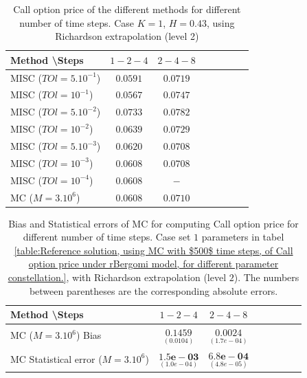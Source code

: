\documentclass[11pt]{article}
\begin{document}
\FloatBarrier

\begin{table}[h!]
	\centering
	\begin{tabular}{l*{6}{c}r}
		Method \textbackslash  Steps           &$1-2-4$ & $2-4-8$ \\
		\hline
		MISC ($TOl=5.10^{-1}$)& $0.0591$  & $0.0719$ \\
		
		MISC ($TOl=10^{-1}$)  &$0.0567$  &$0.0747$   \\
		MISC ($TOl=5.10^{-2}$)  & $0.0733$ & $0.0782$  \\
			MISC ($TOl=10^{-2}$)  & $		0.0639$ & $0.0729$   \\
			MISC ($TOl=5.10^{-3}$)  & $	0.0620$ & $0.0708$   \\
MISC ($TOl=10^{-3}$)  & $	0.0608$ & $0.0708$  \\
MISC ($TOl=10^{-4}$)  & $	0.0608$ & $-$   \\
		\hline
			MC ($M=3.10^6$)  & $0.0608$ & $0.0710$   \\
		\hline 
	\end{tabular}
	\caption{ Call option price of the different methods for different number of time steps. Case $K=1$, $H=0.43$, using Richardson extrapolation (level 2)}
	\label{table: Call option price of the different methods for different number of time steps. Case $K=1$, using Richardson extrapolation_level2}
\end{table}




\begin{table}[h!]
\centering
\begin{tabular}{l*{6}{c}r}
Method \textbackslash  Steps            & $1-2-4$ & $2-4-8$  \\
\hline
MC ($M=3.10^6$)  Bias   &$\underset{( 0.0104)}{\mathbf{ 0.1459}}$  & $\underset{(    1.7e-04)}{\mathbf{0.0024}}$   \\	

MC Statistical error ($M=3.10^6$)   & $\underset{( 1.0e-04)}{\mathbf{1.5e-03}}$  & $\underset{(   4.8e-05)}{\mathbf{    6.8e-04}}$  \\	



\hline
\end{tabular}
\caption{Bias and Statistical errors of MC   for computing Call option price  for different number of time steps. Case set $1$ parameters in tabel \ref{table:Reference solution, using MC with $500$ time steps, of Call option price under rBergomi model, for different parameter constellation.}, with Richardson extrapolation (level $2$). The numbers between parentheses are the corresponding absolute errors.}
\label{Bias and Statistical errors of MC ($M=3.10^6$)  for computing Call option price  for different number of time steps. Case set $1$ parameters, with Richardson extrapolation (level2). The numbers between parentheses are the corresponding absolute errors.}
\end{table}
\end{document}
